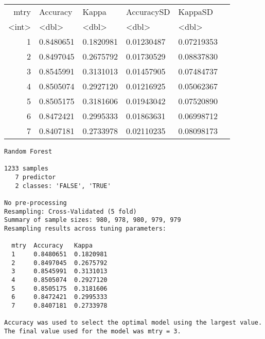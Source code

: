\documentclass[11pt]{article}
\begin{document}
\begin{tabular}{r|lllll}
 mtry & Accuracy & Kappa & AccuracySD & KappaSD\\
 <int> & <dbl> & <dbl> & <dbl> & <dbl>\\
\hline
	 1 & 0.8480651 & 0.1820981 & 0.01230487 & 0.07219353\\
	 2 & 0.8497045 & 0.2675792 & 0.01730529 & 0.08837830\\
	 3 & 0.8545991 & 0.3131013 & 0.01457905 & 0.07484737\\
	 4 & 0.8505074 & 0.2927120 & 0.01216925 & 0.05062367\\
	 5 & 0.8505175 & 0.3181606 & 0.01943042 & 0.07520890\\
	 6 & 0.8472421 & 0.2995333 & 0.01863631 & 0.06998712\\
	 7 & 0.8407181 & 0.2733978 & 0.02110235 & 0.08098173\\
\end{tabular}




    \begin{verbatim}
Random Forest

1233 samples
   7 predictor
   2 classes: 'FALSE', 'TRUE'

No pre-processing
Resampling: Cross-Validated (5 fold)
Summary of sample sizes: 980, 978, 980, 979, 979
Resampling results across tuning parameters:

  mtry  Accuracy   Kappa
  1     0.8480651  0.1820981
  2     0.8497045  0.2675792
  3     0.8545991  0.3131013
  4     0.8505074  0.2927120
  5     0.8505175  0.3181606
  6     0.8472421  0.2995333
  7     0.8407181  0.2733978

Accuracy was used to select the optimal model using the largest value.
The final value used for the model was mtry = 3.
    \end{verbatim}


    \begin{center}
    \end{center}
    { \hspace*{\fill} \\}
\end{document}

